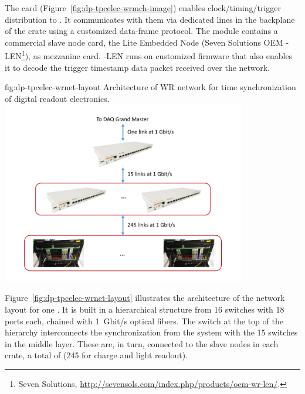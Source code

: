 The  card (Figure~\ref{fig:dp-tpcelec-wrmch-image}) enables clock/timing/trigger distribution to . It communicates with them via dedicated lines in the backplane of the  crate using a customized data-frame protocol. The module contains a commercial  slave node card, the  Lite Embedded Node (Seven Solutions OEM -LEN\footnote{Seven Solutions\texttrademark{}, \url{http://sevensols.com/index.php/products/oem-wr-len/}.}), as mezzanine card. -LEN runs on customized firmware that also enables it to decode the trigger timestamp data packet received over the  network.

\begin{dunefigure}{fig:dp-tpcelec-wrnet-layout}
{Architecture of WR network for time synchronization of digital readout electronics.}
\includegraphics[width=0.8\textwidth]{graphics/dp-tpcelec-wrnet-layout}
\end{dunefigure}

Figure~\ref{fig:dp-tpcelec-wrnet-layout} illustrates the architecture of the  network layout for one . It is built in a hierarchical structure from \num{16}  switches with \num{18} ports each, chained with \SI{1}{Gbit/s} optical fibers. The switch at the top of the hierarchy interconnects the synchronization  from the  system with the \num{15} switches in the middle layer. These are, in turn, connected to the  slave nodes in each  crate, a total of (\num{245} for charge and light readout). 
